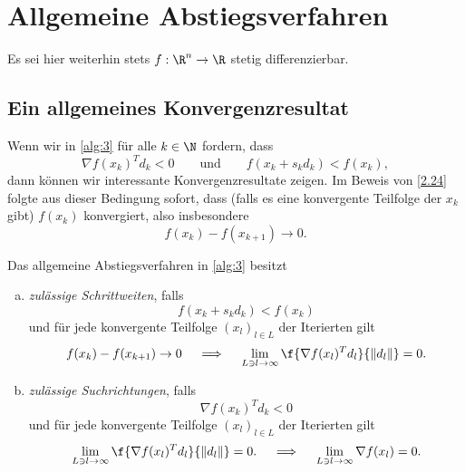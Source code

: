 \section{Allgemeine Abstiegsverfahren}


Es sei hier weiterhin stets $f: \R^n \to \R$ stetig differenzierbar.

\begin{alg} \label{alg:3}
	\begin{algorithmic}
			\EndIf
		\EndFor
	\end{algorithmic}
\end{alg}

\subsection{Ein allgemeines Konvergenzresultat}

Wenn wir in \ref{alg:3} für alle $k \in \N$ fordern, dass
\[
	\nabla f(x_k)^T d_k < 0
	\qquad\text{und}\qquad
	f(x_k + s_k d_k) < f(x_k),
\]
dann können wir interessante Konvergenzresultate zeigen.
Im Beweis von \ref{2.24} folgte aus dieser Bedingung sofort, dass (falls es eine konvergente Teilfolge der $x_k$ gibt) $f(x_k)$ konvergiert, also insbesondere
\[
	f(x_k) - f(x_{k+1}) \to 0.
\]

\begin{df} \label{2.28}
	Das allgemeine Abstiegsverfahren in \ref{alg:3} besitzt
	\begin{enumerate}[(a)]
		\item
			\emph{zulässige Schrittweiten}, falls
			\[
				f(x_k + s_k d_k) < f(x_k)
			\]
			und für jede konvergente Teilfolge $(x_l)_{l\in L}$ der Iterierten gilt
			\[
				f(x_k) - f(x_{k+1}) \to 0
				\quad\implies\quad
				\lim_{L \ni l \to \infty} \f{\nabla f(x_l)^T d_l}{\|d_l\|} = 0.
			\]
		\item
			\emph{zulässige Suchrichtungen}, falls
			\[
				\nabla f(x_k)^T d_k < 0
			\]
			und für jede konvergente Teilfolge $(x_l)_{l\in L}$ der Iterierten gilt
			\[
				\lim_{L \ni l \to \infty} \f{\nabla f(x_l)^T d_l}{\|d_l\|} = 0.
				\quad\implies\quad
				\lim_{L \ni l \to \infty} \nabla f(x_l) = 0.
			\]
	\end{enumerate}
\end{df}

